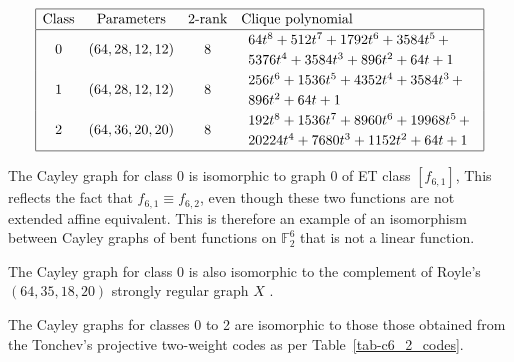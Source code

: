 \documentclass[12pt,a4paper]{article}
\newcommand{\mb}[1]{\mathbb{#1}}
\newcommand{\F}{\mb{F}}
\begin{document}
\begin{table}[!bhpt] %
%
\small{}
\begin{align*}
\def\arraystretch{1.2}
\begin{array}{|cccl|}
\hline
\text{Class} &
\text{Parameters} &
\text{2-rank} &
\text{Clique polynomial}
\\
\hline
0 &
(64, 28, 12, 12) &
8 &
\begin{array}{l}
64t^{8} + 512t^{7} + 1792t^{6} + 3584t^{5}
\,+
\\
 5376t^{4} + 3584t^{3} + 896t^{2} + 64t + 1
\end{array}
\\
1 &
(64, 28, 12, 12) &
8 &
\begin{array}{l}
256t^{6} + 1536t^{5} + 4352t^{4} + 3584t^{3}
\,+
\\
 896t^{2} + 64t + 1
\end{array}
\\
2 &
(64, 36, 20, 20) &
8 &
\begin{array}{l}
192t^{8} + 1536t^{7} + 8960t^{6} + 19968t^{5}
\,+
\\
 20224t^{4} + 7680t^{3} + 1152t^{2} + 64t + 1
\end{array}
\\
\hline
\end{array}
\end{align*}
%
\caption{$[f_{6,2}]$ extended Cayley classes.}
\label{tab-c6_2_EC_classes}
\end{table}

The Cayley graph for class 0 is isomorphic to graph 0 of ET class $[f_{6,1}]$,
This reflects the fact that $f_{6,1} \equiv f_{6,2}$, even though these two functions are not
extended affine equivalent.
This is therefore an example of an isomorphism between Cayley graphs of bent functions on
$\F_2^6$ that is not a linear function.

The Cayley graph for class 0 is also isomorphic to the complement of Royle's $(64,35,18,20)$ strongly regular graph $X$
\cite{Roy08normal}.

%
%

The Cayley graphs for classes 0 to 2 are isomorphic to those those obtained from the
Tonchev's projective two-weight codes \cite{Ton07codes} as per Table~\ref{tab-c6_2_codes}.
\end{document}
